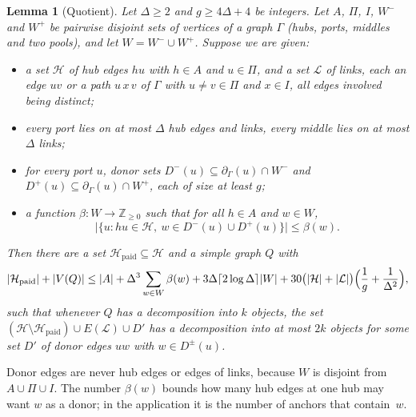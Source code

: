 \documentclass[11pt]{article}
\newtheorem{lemma}[theorem]{Lemma}
\theoremstyle{definition}
\theoremstyle{remark}
\numberwithin{equation}{section}
\numberwithin{figure}{section}
\numberwithin{table}{section}
\newcommand{\NN}{\partial}
\newcommand{\cH}{\mathcal{H}}
\newcommand{\cL}{\mathcal{L}}
\newcommand{\paid}{\mathrm{paid}}
\begin{document}
\begin{lemma}[Quotient]\label{lem:quotient}
Let $\Delta\ge2$ and $g\ge4\Delta+4$ be integers. Let $A$, $\Pi$,
$I$, $W^-$ and $W^+$ be pairwise disjoint sets of vertices of a graph $\Gamma$
(hubs, ports, middles and two pools), and let $W=W^-\cup W^+$. Suppose we are
given:
\begin{itemize}[leftmargin=2em,itemsep=1pt]
\item a set $\cH$ of \emph{hub edges} $hu$ with $h\in A$ and $u\in\Pi$, and a
set $\cL$ of \emph{links}, each an edge $uv$ or a path $u\,x\,v$ of $\Gamma$
with $u\ne v\in\Pi$ and $x\in I$, all edges involved being distinct;
\item every port lies on at most $\Delta$ hub edges and links, every middle lies
on at most $\Delta$ links;
\item for every port $u$, \emph{donor sets} $D^-(u)\subseteq\NN_\Gamma(u)\cap
W^-$ and $D^+(u)\subseteq\NN_\Gamma(u)\cap W^+$, each of size at least $g$;
\item a function $\beta:W\to\mathbb{Z}_{\ge0}$ such that for all $h\in A$ and
$w\in W$,
\begin{equation}\label{eq:beta}
\bigl|\{u: hu\in\cH,\ w\in D^-(u)\cup D^+(u)\}\bigr|\le\beta(w).
\end{equation}
\end{itemize}
Then there are a set $\cH_\paid\subseteq\cH$ and a simple graph $Q$ with
\[
|\cH_\paid|+|V(Q)|\le|A|+\Delta^3\sum_{w\in W}\beta(w)
+3\Delta\lceil2\log\Delta\rceil|W|+30\bigl(|\cH|+|\cL|\bigr)\Bigl(\frac1g+\frac1{\Delta^2}\Bigr),
\]
such that whenever $Q$ has a decomposition into $k$ objects, the set
$(\cH\setminus\cH_\paid)\cup E(\cL)\cup D'$ has a decomposition into at most $2k$
objects for some set $D'$ of \emph{donor edges} $uw$ with $w\in D^\pm(u)$.
\end{lemma}

Donor edges are never hub edges or edges of links, because $W$ is disjoint from
$A\cup\Pi\cup I$. The number $\beta(w)$ bounds how many hub edges at one hub
may want $w$ as a donor; in the application it is the number of anchors that
contain~$w$.
\end{document}
